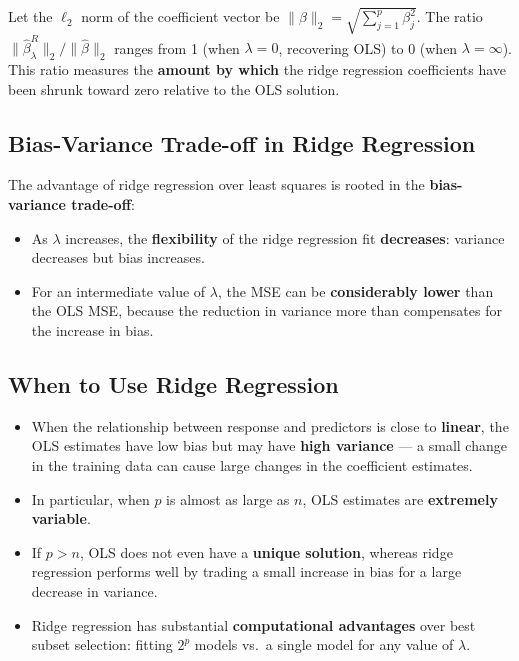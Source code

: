 \documentclass[11pt,a4paper]{article}
\theoremstyle{definition}
\theoremstyle{plain}
\theoremstyle{remark}
\begin{document}
Let the $\ell_2$ norm of the coefficient vector be $\|\beta\|_2 = \sqrt{\sum_{j=1}^{p} \beta_j^2}$. The ratio $\|\hat{\beta}^R_\lambda\|_2 / \|\hat{\beta}\|_2$ ranges from 1 (when $\lambda = 0$, recovering OLS) to 0 (when $\lambda = \infty$). This ratio measures the \textbf{amount by which} the ridge regression coefficients have been shrunk toward zero relative to the OLS solution.

\subsection{Bias-Variance Trade-off in Ridge Regression}

The advantage of ridge regression over least squares is rooted in the \textbf{bias-variance trade-off}:
\begin{itemize}
    \item As $\lambda$ increases, the \textbf{flexibility} of the ridge regression fit \textbf{decreases}: variance decreases but bias increases.
    \item For an intermediate value of $\lambda$, the MSE can be \textbf{considerably lower} than the OLS MSE, because the reduction in variance more than compensates for the increase in bias.
\end{itemize}

\subsection{When to Use Ridge Regression}

\begin{tcolorbox}[colback=green!5!white,colframe=green!75!black,title=\textbf{When Ridge Regression Helps}]
\begin{itemize}
    \item When the relationship between response and predictors is close to \textbf{linear}, the OLS estimates have low bias but may have \textbf{high variance} --- a small change in the training data can cause large changes in the coefficient estimates.
    \item In particular, when $p$ is almost as large as $n$, OLS estimates are \textbf{extremely variable}.
    \item If $p > n$, OLS does not even have a \textbf{unique solution}, whereas ridge regression performs well by trading a small increase in bias for a large decrease in variance.
    \item Ridge regression has substantial \textbf{computational advantages} over best subset selection: fitting $2^p$ models vs.\ a single model for any value of $\lambda$.
\end{itemize}
\end{tcolorbox}
\end{document}
